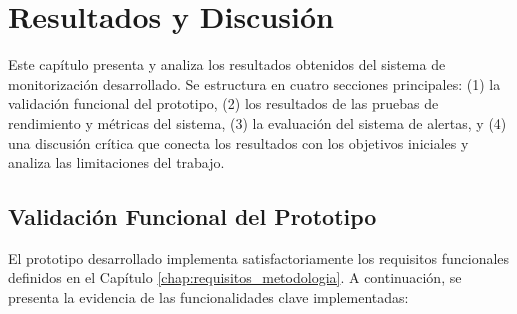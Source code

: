 \chapter{Resultados y Discusión}
\label{chap:resultados_discusion}

Este capítulo presenta y analiza los resultados obtenidos del sistema de monitorización desarrollado. Se estructura en cuatro secciones principales: (1) la validación funcional del prototipo, (2) los resultados de las pruebas de rendimiento y métricas del sistema, (3) la evaluación del sistema de alertas, y (4) una discusión crítica que conecta los resultados con los objetivos iniciales y analiza las limitaciones del trabajo.

\section{Validación Funcional del Prototipo}
\label{sec:validacion_funcional}

El prototipo desarrollado implementa satisfactoriamente los requisitos funcionales definidos en el Capítulo \ref{chap:requisitos_metodologia}. A continuación, se presenta la evidencia de las funcionalidades clave implementadas:

